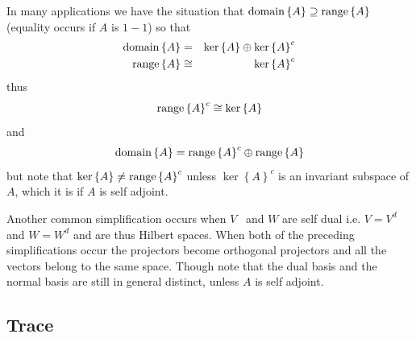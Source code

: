 In many applications we have the situation that $%
\mathop{\rm domain}%
\left\{ A\right\} \supseteq 
\mathop{\rm range}%
\left\{ A\right\} $ (equality occurs if $A$ is $1-1$) so that 
\begin{eqnarray}
\mathop{\rm domain}%
\left\{ A\right\} &=&\ker \left\{ A\right\} \oplus \ker \left\{ A\right\}
^{c}  \nonumber \\
\mathop{\rm range}%
\left\{ A\right\} &\cong &\ker \left\{ A\right\} ^{c}
\end{eqnarray}%
thus 
\begin{equation}
\mathop{\rm range}%
\left\{ A\right\} ^{c}\cong \ker \left\{ A\right\}
\end{equation}%
and 
\begin{equation}
\mathop{\rm domain}%
\left\{ A\right\} =%
\mathop{\rm range}%
\left\{ A\right\} ^{c}\oplus 
\mathop{\rm range}%
\left\{ A\right\}
\end{equation}%
but note that $\ker \left\{ A\right\} \neq 
\mathop{\rm range}%
\left\{ A\right\} ^{c}$ unless $\ker \left\{ A\right\} ^{c}$ is an invariant
subspace of $A$, which it is if $A$ is self adjoint.

Another common simplification occurs when $V$ \ and $W$ are self dual i.e. $%
V=V^{d}$ and $W=W^{d}$ and are thus Hilbert spaces. When both of the
preceding simplifications occur the projectors become orthogonal projectors
and all the vectors belong to the same space. Though note that the dual
basis and the normal basis are still in general distinct, unless $A$ is self
adjoint.

\subsection{Trace}

